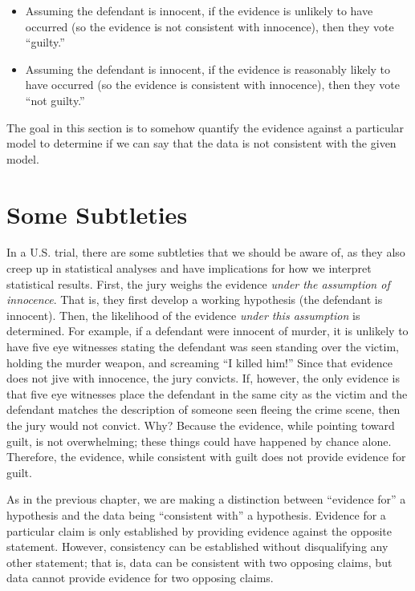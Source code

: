 \documentclass[
]{book}
\providecommand{\tightlist}{%
  \setlength{\itemsep}{0pt}\setlength{\parskip}{0pt}}
\theoremstyle{plain}
\theoremstyle{mydefn}
\theoremstyle{myexmpl}
\theoremstyle{remark}
\begin{document}
\begin{itemize}
\tightlist
\item
  Assuming the defendant is innocent, if the evidence is unlikely to have occurred (so the evidence is not consistent with innocence), then they vote ``guilty.''
\item
  Assuming the defendant is innocent, if the evidence is reasonably likely to have occurred (so the evidence is consistent with innocence), then they vote ``not guilty.''
\end{itemize}

The goal in this section is to somehow quantify the evidence against a particular model to determine if we can say that the data is not consistent with the given model.

\hypertarget{some-subtleties}{%
\section{Some Subtleties}\label{some-subtleties}}

In a U.S. trial, there are some subtleties that we should be aware of, as they also creep up in statistical analyses and have implications for how we interpret statistical results. First, the jury weighs the evidence \emph{under the assumption of innocence}. That is, they first develop a working hypothesis (the defendant is innocent). Then, the likelihood of the evidence \emph{under this assumption} is determined. For example, if a defendant were innocent of murder, it is unlikely to have five eye witnesses stating the defendant was seen standing over the victim, holding the murder weapon, and screaming ``I killed him!'' Since that evidence does not jive with innocence, the jury convicts. If, however, the only evidence is that five eye witnesses place the defendant in the same city as the victim and the defendant matches the description of someone seen fleeing the crime scene, then the jury would not convict. Why? Because the evidence, while pointing toward guilt, is not overwhelming; these things could have happened by chance alone. Therefore, the evidence, while consistent with guilt does not provide evidence for guilt.

As in the previous chapter, we are making a distinction between ``evidence for'' a hypothesis and the data being ``consistent with'' a hypothesis. Evidence for a particular claim is only established by providing evidence against the opposite statement. However, consistency can be established without disqualifying any other statement; that is, data can be consistent with two opposing claims, but data cannot provide evidence for two opposing claims.
\end{document}
